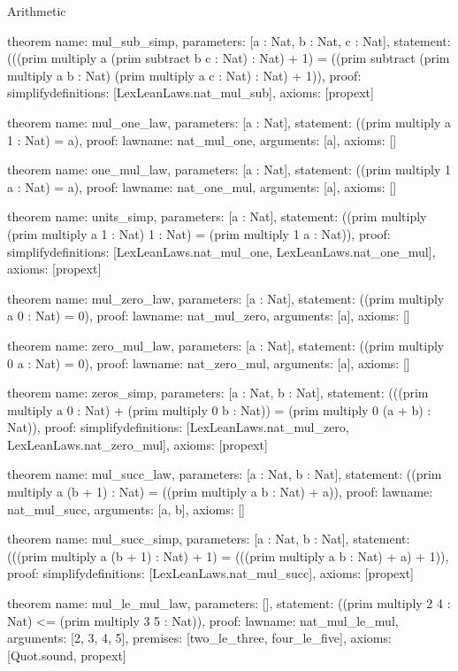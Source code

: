 \begin{lexlean}{Arithmetic}
\begin{semanticmodule}
theorem{
  name: mul_sub_simp,
  parameters: [a : Nat, b : Nat, c : Nat],
  statement: (((prim multiply a (prim subtract b c : Nat) : Nat) + 1) = ((prim subtract (prim multiply a b : Nat) (prim multiply a c : Nat) : Nat) + 1)),
  proof: simplify{definitions: [LexLeanLaws.nat_mul_sub]},
  axioms: [propext]
}

theorem{
  name: mul_one_law,
  parameters: [a : Nat],
  statement: ((prim multiply a 1 : Nat) = a),
  proof: law{name: nat_mul_one, arguments: [a]},
  axioms: []
}

theorem{
  name: one_mul_law,
  parameters: [a : Nat],
  statement: ((prim multiply 1 a : Nat) = a),
  proof: law{name: nat_one_mul, arguments: [a]},
  axioms: []
}

theorem{
  name: units_simp,
  parameters: [a : Nat],
  statement: ((prim multiply (prim multiply a 1 : Nat) 1 : Nat) = (prim multiply 1 a : Nat)),
  proof: simplify{definitions: [LexLeanLaws.nat_mul_one, LexLeanLaws.nat_one_mul]},
  axioms: [propext]
}

theorem{
  name: mul_zero_law,
  parameters: [a : Nat],
  statement: ((prim multiply a 0 : Nat) = 0),
  proof: law{name: nat_mul_zero, arguments: [a]},
  axioms: []
}

theorem{
  name: zero_mul_law,
  parameters: [a : Nat],
  statement: ((prim multiply 0 a : Nat) = 0),
  proof: law{name: nat_zero_mul, arguments: [a]},
  axioms: []
}

theorem{
  name: zeros_simp,
  parameters: [a : Nat, b : Nat],
  statement: (((prim multiply a 0 : Nat) + (prim multiply 0 b : Nat)) = (prim multiply 0 (a + b) : Nat)),
  proof: simplify{definitions: [LexLeanLaws.nat_mul_zero, LexLeanLaws.nat_zero_mul]},
  axioms: [propext]
}

theorem{
  name: mul_succ_law,
  parameters: [a : Nat, b : Nat],
  statement: ((prim multiply a (b + 1) : Nat) = ((prim multiply a b : Nat) + a)),
  proof: law{name: nat_mul_succ, arguments: [a, b]},
  axioms: []
}

theorem{
  name: mul_succ_simp,
  parameters: [a : Nat, b : Nat],
  statement: (((prim multiply a (b + 1) : Nat) + 1) = (((prim multiply a b : Nat) + a) + 1)),
  proof: simplify{definitions: [LexLeanLaws.nat_mul_succ]},
  axioms: [propext]
}

theorem{
  name: mul_le_mul_law,
  parameters: [],
  statement: ((prim multiply 2 4 : Nat) <= (prim multiply 3 5 : Nat)),
  proof: law{name: nat_mul_le_mul, arguments: [2, 3, 4, 5], premises: [two_le_three, four_le_five]},
  axioms: [Quot.sound, propext]
}


\end{semanticmodule}
\end{lexlean}

